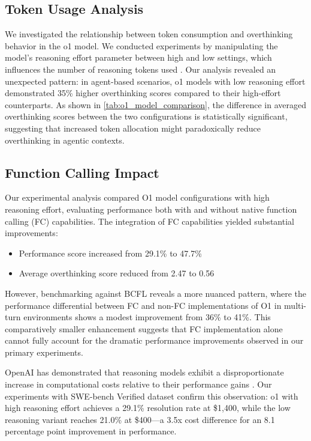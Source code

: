 \subsection{Token Usage Analysis}
We investigated the relationship between token consumption and overthinking behavior in the o1 model. We conducted experiments by manipulating the model's reasoning effort parameter between high and low settings, which influences the number of reasoning tokens used \cite{openai_chat_api}. Our analysis revealed an unexpected pattern: in agent-based scenarios, o1 models with low reasoning effort demonstrated 35\% higher overthinking scores compared to their high-effort counterparts. As shown in \cref{tab:o1_model_comparison}, the difference in averaged overthinking scores between the two configurations is statistically significant, suggesting that increased token allocation might paradoxically reduce overthinking in agentic contexts.

\subsection{Function Calling Impact}
Our experimental analysis compared O1 model configurations with high reasoning effort, evaluating performance both with and without native function calling (FC) capabilities. The integration of FC capabilities yielded substantial improvements:
\begin{itemize}
    \item Performance score increased from 29.1\% to 47.7\%
    \item Average overthinking score reduced from 2.47 to 0.56
\end{itemize}

However, benchmarking against BCFL \cite{berkeley-function-calling-leaderboard} reveals a more nuanced pattern, where the performance differential between FC and non-FC implementations of O1 in multi-turn environments shows a modest improvement from 36\% to 41\%. This comparatively smaller enhancement suggests that FC implementation alone cannot fully account for the dramatic performance improvements observed in our primary experiments.

OpenAI has demonstrated that reasoning models exhibit a disproportionate increase in computational costs relative to their performance gains \cite{arcprize2024oai}. Our experiments with SWE-bench Verified dataset confirm this observation: o1 with high reasoning effort achieves a 29.1\% resolution rate at \$1,400, while the low reasoning variant reaches 21.0\% at \$400—a 3.5x cost difference for an 8.1 percentage point improvement in performance.

